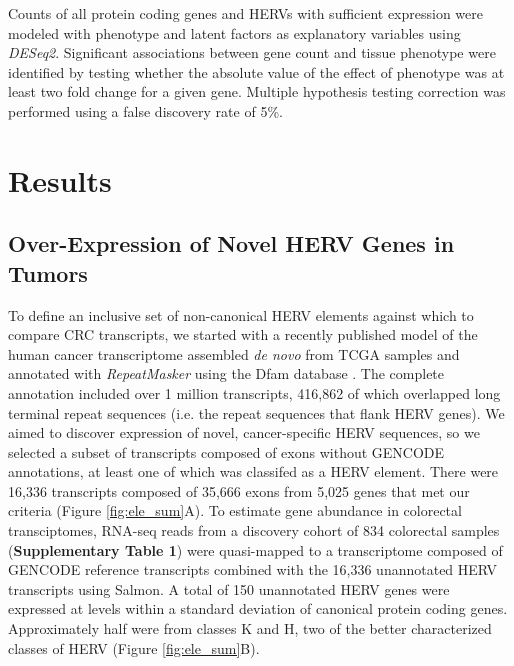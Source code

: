 \documentclass[11pt,letterpaper]{article}
\begin{document}
Counts of all protein coding genes and HERVs with sufficient expression were modeled with phenotype and latent factors as explanatory variables using \emph{DESeq2}.
Significant associations between gene count and tissue phenotype were identified by testing whether the absolute value of the effect of phenotype was at least two fold change for a given gene.
Multiple hypothesis testing correction was performed using a false discovery rate of 5\%.

\section*{Results}
\subsection*{Over-Expression of Novel HERV Genes in Tumors}
To define an inclusive set of non-canonical HERV elements against which to compare CRC transcripts, we started with a recently published model of the human cancer transcriptome assembled \emph{de novo} from TCGA samples and annotated with \emph{RepeatMasker} using the Dfam database \citep{Attig2019}.
The complete annotation included over 1 million transcripts, 416,862 of which overlapped long terminal repeat sequences (i.e. the repeat sequences that flank HERV genes).
We aimed to discover expression of novel, cancer-specific HERV sequences, so we selected a subset of transcripts composed of exons without GENCODE annotations, at least one of which was classifed as a HERV element.
There were 16,336 transcripts composed of 35,666 exons from 5,025 genes that met our criteria (Figure \ref{fig:ele_sum}A).
To estimate gene abundance in colorectal transciptomes, RNA-seq reads from a discovery cohort of 834 colorectal samples (\textbf{Supplementary Table 1}) were quasi-mapped to a transcriptome composed of GENCODE reference transcripts combined with the 16,336 unannotated HERV transcripts using Salmon.
A total of 150 unannotated HERV genes were expressed at levels within a standard deviation of canonical protein coding genes.
Approximately half were from classes K and H, two of the better characterized classes of HERV (Figure \ref{fig:ele_sum}B).
\end{document}
